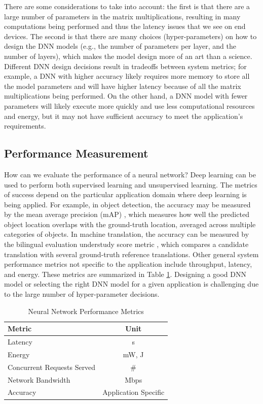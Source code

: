There are some considerations to take into account: the first is that there are a large number of parameters in the matrix multiplications, resulting in many computations being performed and thus the latency issues that we see on end devices. The second is that there are many choices (hyper-parameters) on how to design the DNN models (e.g., the number of parameters per layer, and the number of layers), which makes the model design more of an art than a science. Different DNN design decisions result in tradeoffs between system metrics; for example, a DNN with higher accuracy likely requires more memory to store all the model parameters and will have higher latency because of all the matrix multiplications being performed. On the other hand, a DNN model with fewer parameters will likely execute more quickly and use less computational resources and energy, but it may not have sufficient accuracy to meet the application's requirements.


\subsection{Performance Measurement}
How can we evaluate the performance of a neural network?
Deep learning can be used to perform both supervised learning and unsupervised learning. The metrics of success depend on the particular application domain where deep learning is being applied. For example, in object detection, the accuracy may be measured by the mean average precision (mAP) \cite{ILSVRC15}, which measures how well the predicted object location overlaps with the ground-truth location, averaged across multiple categories of objects. In machine translation, the accuracy can be measured by the bilingual evaluation understudy score metric \cite{10.3115/1073083.1073135}, which compares a candidate translation with several ground-truth reference translations. 
Other general system performance metrics not specific to the application include throughput, latency, and energy. These metrics are summarized in Table \ref{tab:NN-Perfomance-Metrics}.
Designing a good DNN model or selecting the right DNN model for a given application is challenging due to the large number of hyper-parameter decisions.

\begin{table}[tbp]
	\centering
	\begin{tabular}{|l||c|} 
	\hline 
	 Metric & Unit	\\
	\hline
	Latency  &	s	\\
	Energy	& mW, J	\\
	Concurrent Requests Served	&	\#  \\
	Network Bandwidth	& Mbps			  \\
	Accuracy & Application Specific		\\
	\hline
	\end{tabular}
	\caption{Neural Network Performance Metrics\label{tab:NN-Perfomance-Metrics}}
\end{table}

